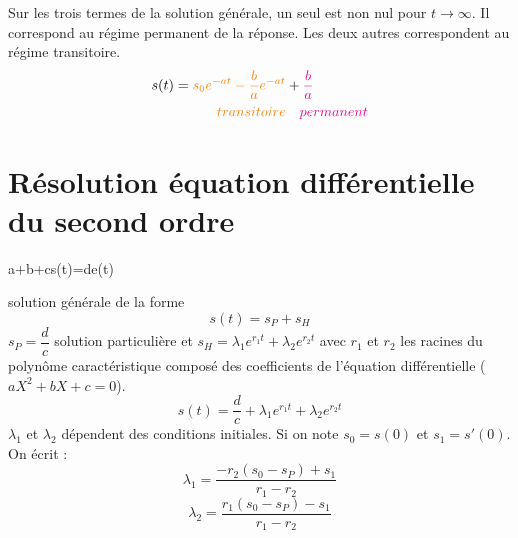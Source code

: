 \begin{center}
    
\end{center}
Sur les trois termes de la solution générale, un seul est non
nul pour $t\to\infty$. Il correspond au régime permanent de
la réponse. Les deux autres correspondent au régime transitoire.
\begin{align*}
    s(t)=\textcolor{orange}{s_0e^{-at}-\dfrac{b}{a}e^{-at}}&+
    \textcolor{magenta}{\dfrac{b}{a}}\\
    \textcolor{orange}{transitoire} &\quad\textcolor{magenta}{permanent}
\end{align*}

\section{Résolution équation différentielle du second ordre}
\begin{bequation}
    a+b+cs(t)=d\cdot e(t)
\end{bequation}
solution générale de la forme 
\[
    s(t)=s_P+s_H
\]
$s_P=\dfrac{d}{c}$ solution particulière et $s_H=\lambda_1 e^{r_1 t}+
\lambda_2 e^{r_2 t}$ avec $r_1$ et $r_2$ les racines du polynôme 
caractéristique composé des coefficients de l'équation différentielle 
($aX^2+bX+c=0$).
\[
    s(t)=\dfrac{d}{c}+\lambda_1 e^{r_1 t}+\lambda_2 e^{r_2 t}
\]
$\lambda_1$ et $\lambda_2$ dépendent des conditions initiales. 
Si on note $s_0=s(0)$ et $s_1=s'(0)$. On écrit :
\[
    \lambda_1=\dfrac{-r_2(s_0-s_P)+s_1}{r_1-r_2}
\]
\[
    \lambda_2=\dfrac{r_1(s_0-s_P)-s_1}{r_1-r_2}
\]
\begin{center}
    
\end{center}

